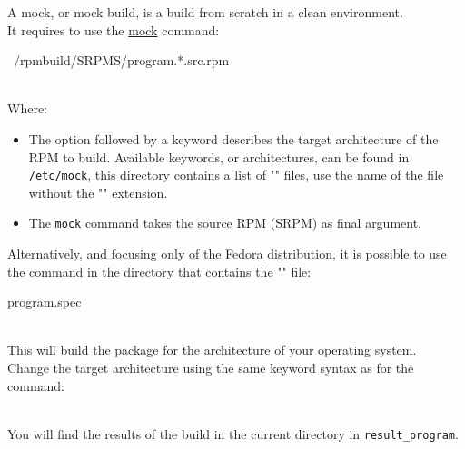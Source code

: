 A mock, or mock build, is a build from scratch in a clean environment. \\
It requires to use the \href{https://rpm-software-management.github.io/mock/}{mock} command:
{\small{
\begin{script}
\fprompt{~}    ~/rpmbuild/SRPMS/program.*.src.rpm
\end{script}}}
\\[-0.75cm]
\noindent Where:
\begin{itemize}
\item The  option followed by a keyword describes the target architecture of the RPM to build. 
Available keywords, or architectures, can be found in \texttt{/etc/mock}, this directory contains a list of "" files, 
use the name of the file without the "" extension. 
\item The \texttt{mock} command takes the source RPM (SRPM) as final argument. 
\end{itemize}
Alternatively, and focusing only of the Fedora distribution, it is possible to use the  command in the directory that contains the "" file: 
\begin{script}
\fprompt{~}   program.spec
\fprompt{~}     
\end{script}
\\[-0.5cm]
\noindent This will build the package for the architecture of your operating system. \\
Change the target architecture using the same keyword syntax as for the  command: 
\begin{script}
\fprompt{~}     
\end{script}
\\[-0.5cm]
\noindent
You will find the results of the build in the current directory in \texttt{result\_program}. 

